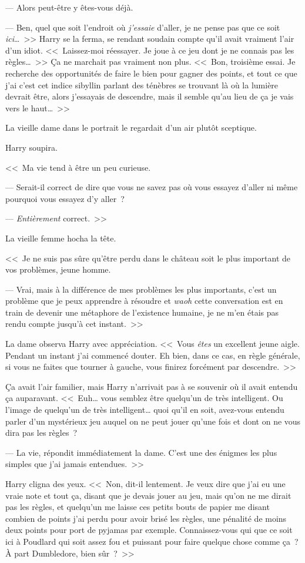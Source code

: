 --- Alors peut-être y êtes-vous déjà.

--- Ben, quel que soit l'endroit où \emph{j'essaie} d'aller, je ne pense pas que ce soit \emph{ici}…~>> Harry se la ferma, se rendant soudain compte qu'il avait vraiment l'air d'un idiot. <<~Laissez-moi réessayer. Je joue à ce jeu dont je ne connais pas les règles…~>> Ça ne marchait pas vraiment non plus. <<~Bon, troisième essai. Je recherche des opportunités de faire le bien pour gagner des points, et tout ce que j'ai c'est cet indice sibyllin parlant des ténèbres se trouvant là où la lumière devrait être, alors j'essayais de descendre, mais il semble qu'au lieu de ça je vais vers le haut…~>>

La vieille dame dans le portrait le regardait d'un air plutôt sceptique.

Harry soupira.

<<~Ma vie tend à être un peu curieuse.

--- Serait-il correct de dire que vous ne savez pas où vous essayez d'aller ni même pourquoi vous essayez d'y aller~?

--- \emph{Entièrement} correct.~>>

La vieille femme hocha la tête.

<<~Je ne suis pas sûre qu'être perdu dans le château soit le plus important de vos problèmes, jeune homme.

--- Vrai, mais à la différence de mes problèmes les plus importants, c'est un problème que je peux apprendre à résoudre et \emph{waoh} cette conversation est en train de devenir une métaphore de l'existence humaine, je ne m'en étais pas rendu compte jusqu'à cet instant.~>>

La dame observa Harry avec appréciation. <<~Vous \emph{êtes} un excellent jeune aigle. Pendant un instant j'ai commencé douter. Eh bien, dans ce cas, en règle générale, si vous ne faites que tourner à gauche, vous finirez forcément par descendre.~>>

Ça avait l'air familier, mais Harry n'arrivait pas à se souvenir où il avait entendu ça auparavant. <<~Euh… vous semblez être quelqu'un de très intelligent. Ou l'image de quelqu'un de très intelligent… quoi qu'il en soit, avez-vous entendu parler d'un mystérieux jeu auquel on ne peut jouer qu'une fois et dont on ne vous dira pas les règles~?

--- La vie, répondit immédiatement la dame. C'est une des énigmes les plus simples que j'ai jamais entendues.~>>

Harry cligna des yeux. <<~Non, dit-il lentement. Je veux dire que j'ai eu une vraie note et tout ça, disant que je devais jouer au jeu, mais qu'on ne me dirait pas les règles, et quelqu'un me laisse ces petits bouts de papier me disant combien de points j'ai perdu pour avoir brisé les règles, une pénalité de moins deux points pour port de pyjamas par exemple. Connaissez-vous qui que ce soit ici à Poudlard qui soit assez fou et puissant pour faire quelque chose comme ça~? À part Dumbledore, bien sûr~?~>>

